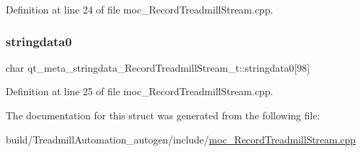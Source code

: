 Definition at line 24 of file moc\+\_\+\+Record\+Treadmill\+Stream.\+cpp.

\mbox{\label{structqt__meta__stringdata___record_treadmill_stream__t_a23cb5bbf2f1df8ccc64367e5a1bc2d25}} 
\subsubsection{\texorpdfstring{stringdata0}{stringdata0}}
{\footnotesize\ttfamily char qt\+\_\+meta\+\_\+stringdata\+\_\+\+Record\+Treadmill\+Stream\+\_\+t\+::stringdata0\mbox{[}98\mbox{]}}



Definition at line 25 of file moc\+\_\+\+Record\+Treadmill\+Stream.\+cpp.



The documentation for this struct was generated from the following file\+:\begin{DoxyCompactItemize}
\item 
build/\+Treadmill\+Automation\+\_\+autogen/include/\hyperlink{moc___record_treadmill_stream_8cpp}{moc\+\_\+\+Record\+Treadmill\+Stream.\+cpp}\end{DoxyCompactItemize}
